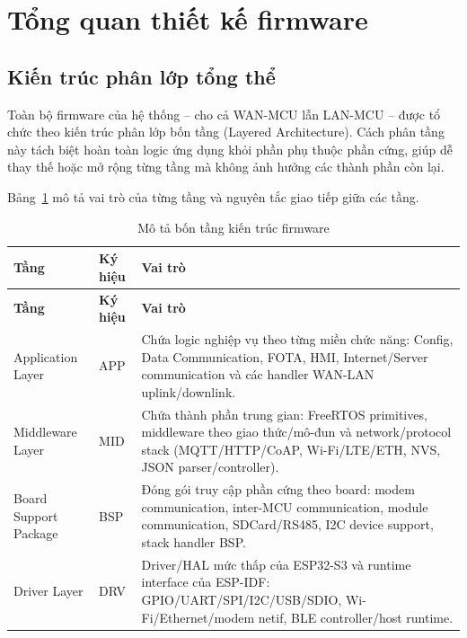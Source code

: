 \section{Tổng quan thiết kế firmware}
    \subsection{Kiến trúc phân lớp tổng thể}

    Toàn bộ firmware của hệ thống -- cho cả WAN-MCU lẫn LAN-MCU -- được tổ chức theo kiến trúc phân lớp bốn tầng (Layered Architecture). Cách phân tầng này tách biệt hoàn toàn logic ứng dụng khỏi phần phụ thuộc phần cứng, giúp dễ thay thế hoặc mở rộng từng tầng mà không ảnh hưởng các thành phần còn lại.

    Bảng~\ref{tab:layer_desc} mô tả vai trò của từng tầng và nguyên tắc giao tiếp giữa các tầng.

    \begin{longtable}{|p{}|p{}|p{}|}
        \caption{Mô tả bốn tầng kiến trúc firmware}
        \label{tab:layer_desc} \\

        \hline
        \textbf{Tầng} & \textbf{Ký hiệu} & \textbf{Vai trò} \\ \hline
        \endfirsthead

        \hline
        \textbf{Tầng} & \textbf{Ký hiệu} & \textbf{Vai trò} \\ \hline
        \endhead

        Application Layer & APP & Chứa logic nghiệp vụ theo từng miền chức năng: Config, Data Communication, FOTA, HMI, Internet/Server communication và các handler WAN-LAN uplink/downlink. \\ \hline

        Middleware Layer & MID & Chứa thành phần trung gian: FreeRTOS primitives, middleware theo giao thức/mô-đun và network/protocol stack (MQTT/HTTP/CoAP, Wi-Fi/LTE/ETH, NVS, JSON parser/controller). \\ \hline

        Board Support Package & BSP & Đóng gói truy cập phần cứng theo board: modem communication, inter-MCU communication, module communication, SDCard/RS485, I2C device support, stack handler BSP. \\ \hline

        Driver Layer & DRV & Driver/HAL mức thấp của ESP32-S3 và runtime interface của ESP-IDF: GPIO/UART/SPI/I2C/USB/SDIO, Wi-Fi/Ethernet/modem netif, BLE controller/host runtime. \\ \hline

    \end{longtable}
    
